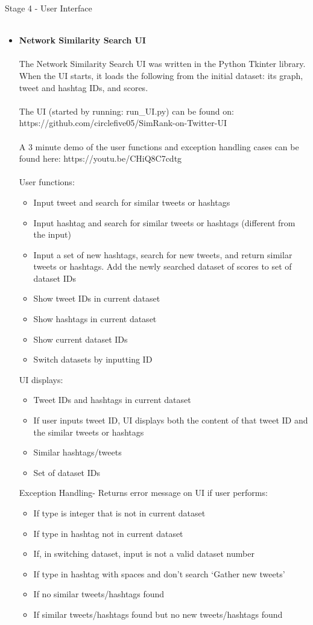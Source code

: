 \documentclass[10pt]{article}
\begin{document}
Stage 4 - User Interface \\\\
\begin{itemize} 
\item{\bf Network Similarity Search UI} 
\\\\
The Network Similarity Search UI was written in the Python Tkinter library. When the UI starts, it loads the following from the initial dataset: its graph, tweet and hashtag IDs, and scores. 
\\\\
The UI (started by running: run\_UI.py) can be found on: \\
https://github.com/circlefive05/SimRank-on-Twitter-UI
\\\\
A 3 minute demo of the user functions and exception handling cases can be found here: https://youtu.be/CHiQ8C7cdtg
\\\\
User functions:
\begin{itemize} 
\item Input tweet and search for similar tweets or hashtags
\item Input hashtag and search for similar tweets or hashtags (different from the input)
\item Input a set of new hashtags, search for new tweets, and return similar tweets or hashtags. Add the newly searched dataset of scores to set of dataset IDs
\item Show tweet IDs in current dataset
\item Show hashtags in current dataset
\item Show current dataset IDs
\item Switch datasets by inputting ID
\end{itemize}

UI displays:
\begin{itemize} 
\item Tweet IDs and hashtags in current dataset
\item If user inputs tweet ID, UI displays both the content of that tweet ID and the similar tweets or hashtags
\item Similar hashtags/tweets
\item Set of dataset IDs
\end{itemize}

Exception Handling- Returns error message on UI if user performs:
\begin{itemize} 
\item If type is integer that is not in current dataset
\item If type in hashtag not in current dataset
\item If, in switching dataset, input is not a valid dataset number
\item If type in hashtag with spaces and don’t search ‘Gather new tweets’
\item If no similar tweets/hashtags found
\item If similar tweets/hashtags found but no new tweets/hashtags found
\end{itemize}

\end{itemize}
\end{document}
